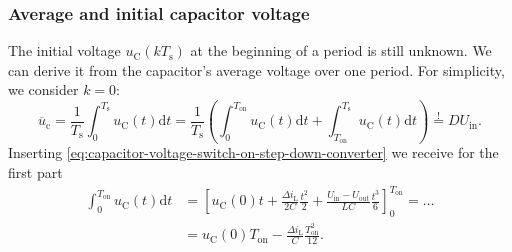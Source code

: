 \begin{frame}
    \frametitle{Average and initial capacitor voltage}
    The initial voltage $u_\mathrm{C}(k T_\mathrm{s})$ at the beginning of a period is still unknown. We can derive it from the capacitor's average voltage over one period. For simplicity, we consider $k=0$:
    \begin{equation}
            \overline{u}_\mathrm{c} = \frac{1}{T_\mathrm{s}}\int_0^{T_\mathrm{s}} u_\mathrm{C}(t) \mathrm{d}t = \frac{1}{T_\mathrm{s}}\left(\int_0^{T_\mathrm{on}} u_\mathrm{C}(t) \mathrm{d}t + \int_{T_\mathrm{on}}^{T_\mathrm{s}} u_\mathrm{C}(t) \mathrm{d}t\right)  \stackrel{!}{=} D U_\mathrm{in}.
            \label{eq:capacitor-voltage-average-step-down-converter}
    \end{equation}
    Inserting \eqref{eq:capacitor-voltage-switch-on-step-down-converter} we receive for the first part
    \begin{equation}
        \begin{split}
            \int_0^{T_\mathrm{on}} u_\mathrm{C}(t) \mathrm{d}t &= \left[u_\mathrm{C}(0)t + \frac{\Delta i_\mathrm{L}}{2C}\frac{t^2}{2} + \frac{U_\mathrm{in}-U_\mathrm{out}}{LC}\frac{t^3}{6} \right]_{0}^{T_\mathrm{on}}=\ldots\\ &= u_\mathrm{C}(0) T_\mathrm{on} - \frac{\Delta i_\mathrm{L}}{C}\frac{T_\mathrm{on}^2}{12}. 
        \end{split}
    \end{equation}
\end{frame}

